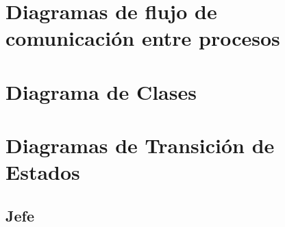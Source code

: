\documentclass[a4paper,12pt]{article}
\begin{document}
\section{Diagramas de flujo de comunicación entre procesos}

\section{Diagrama de Clases}

\section{Diagramas de Transición de Estados}
\subsection{Jefe}
\end{document}
